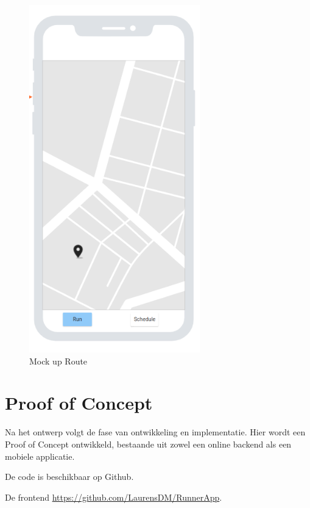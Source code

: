     \begin{figure}[H]
        \includegraphics[width=20em]{./graphics/route_Mockup.png}
        \centering
        \caption{Mock up Route}
        \label{fig:routeMockup}
    \end{figure}

    \pagebreak

    \section{Proof of Concept}

    Na het ontwerp volgt de fase van ontwikkeling en implementatie. Hier wordt een Proof of Concept ontwikkeld, 
    bestaande uit zowel een online backend als een mobiele applicatie.

    \vspace{1cm}


    De code is beschikbaar op Github. 

    \vspace{1cm}

    De frontend \url{https://github.com/LaurensDM/RunnerApp}.
    
    \vspace{1cm}

